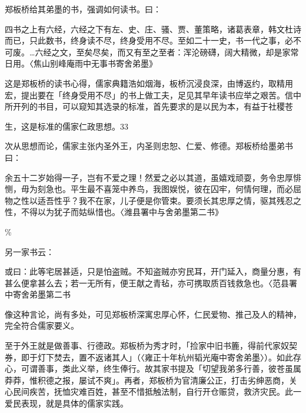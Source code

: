 郑板桥给其弟墨的书，强调如何读书。曰：

\begin{BookQuote}
四书之上有六经，六经之下有左、史、庄、骚、贾、董策略，诸葛表章，韩文杜诗而已，只此数书，终身读不尽，终身受用不尽。至如二十一史，书一代之事，必不可废。…六经之文，至矣尽矣，而又有至之至者：浑沦磅礴，阔大精微，却是家常日用。〈焦山别峰庵雨中无事书寄舍弟墨》
\end{BookQuote}

这是郑板桥的读书心得，儒家典籍浩如烟海，板桥沉浸良深，由博返约，取精用宏，提出要在「终身受用不尽」的书上做工夫，足见其早年读书应举之艰苦。信中所开列的书目，可以窥知其选录的标准，首先要求的是以民为本，有益于社稷苍

\vfill
\begin{BookNotes}
\end{BookNotes}

\noindent 生，这是标准的儒家仁政思想。33

次从思想而论，儒家主张内圣外王，内圣则忠恕、仁爱、修德。郑板桥给墨弟书曰：

\begin{BookQuote}
余五十二岁始得一子，岂有不爱之理！然爱之必以其道，虽嬉戏顽耍，务令忠厚悱恻，毋为刻急也。平生最不喜笼中养鸟，我图娱悦，彼在囚牢，何情何理，而必屈物之性以适吾性乎？我不在家，儿子便是你管束。要须长其忠厚之情，驱其残忍之性，不得以为犹子而姑纵惜也。〈潍县署中与舍弟墨第二书》
\end{BookQuote}

\%

另一家书云：

\begin{BookQuote}
或曰：此等宅居甚适，只是怕盗贼。不知盗贼亦穷民耳，开门延入，商量分惠，有甚么便拿甚么去；若一无所有，便王献之青毡，亦可携取质百钱救急也。〈范县署中寄舍弟墨第二书
\end{BookQuote}

像这种言论，尚有多处，可见郑板桥深寓忠厚心怀，仁民爱物、推己及人的精神，完全符合儒家要义。

至于外王就是做善事、行德政。郑板桥为秀才时，「捡家中旧书簏，得前代家奴契券，即于灯下焚去，置不返诸其人」（〈雍正十年杭州韬光庵中寄舍弟墨〉）。如此存心，可谓善事，类此义举，终生俸行。故其家书提及「切望我弟多行善，彼苍虽属莽莽，惟积德之报，屡试不爽」。再者，郑板桥为官清廉公正，打击劣绅恶商，关心民间疾苦，抚恤灾难百姓，甚至不惜抵触法制，自行开仓赈贷，救济灾民。此一爱民表现，就是具体的儒家实践。

